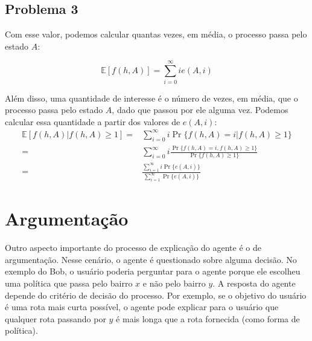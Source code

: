 \documentclass{article}
\begin{document}
\subsection{Problema 3}

\begin{center}
\end{center}

Com esse valor, podemos calcular quantas vezes, em média, o processo passa pelo estado $A$:

\[\mathbb{E}[f(h, A)] = \sum_{i = 0}^{\infty} ie(A,i)\]

Além disso, uma quantidade de interesse é o número de vezes, em média, que o processo passa pelo estado $A$, dado que passou por ele alguma vez. Podemos calcular essa quantidade a partir dos valores de $e(A,i)$:
\begin{align}
  \mathbb{E}[f(h,A) | f(h,A) \ge 1]=& \sum_{i = 0}^{\infty} i \Pr\{f(h,A) = i | f(h,A) \ge 1\} \\
=& \sum_{i = 0}^{\infty} i \frac{\Pr\{f(h,A) = i , f(h,A) \ge 1\}}{\Pr\{f(h,A) \ge 1\}} \\
=& \frac{\sum_{i = 1}^{\infty} i \Pr\{e(A,i)\}}{\sum_{i = 1}^{\infty} \Pr\{e(A,i)\}}
\end{align}

\section{Argumentação}

Outro aspecto importante do processo de explicação do agente é o de argumentação. Nesse cenário, o agente é questionado sobre alguma decisão. No exemplo do Bob, o usuário poderia perguntar para o agente porque ele escolheu uma política que passa pelo bairro $x$ e não pelo bairro $y$. A resposta do agente depende do critério de decisão do processo. Por exemplo, se o objetivo do usuário é uma rota mais curta possível, o agente pode explicar para o usuário que qualquer rota passando por $y$ é mais longa que a rota fornecida (como forma de política).
\end{document}
